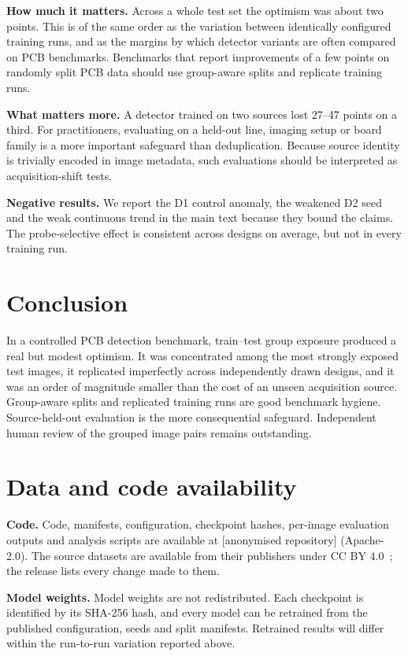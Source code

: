 \documentclass[11pt]{article}
\begin{document}
\textbf{How much it matters.} Across a whole test set the optimism was about two points. This is of the same order as the variation between identically configured training runs, and as the margins by which detector variants are often compared on PCB benchmarks. Benchmarks that report improvements of a few points on randomly split PCB data should use group-aware splits and replicate training runs.

\textbf{What matters more.} A detector trained on two sources lost 27--47 points on a third. For practitioners, evaluating on a held-out line, imaging setup or board family is a more important safeguard than deduplication. Because source identity is trivially encoded in image metadata, such evaluations should be interpreted as acquisition-shift tests.

\textbf{Negative results.} We report the D1 control anomaly, the weakened D2 seed and the weak continuous trend in the main text because they bound the claims. The probe-selective effect is consistent across designs on average, but not in every training run.

\section{Conclusion}
In a controlled PCB detection benchmark, train--test group exposure produced a real but modest optimism. It was concentrated among the most strongly exposed test images, it replicated imperfectly across independently drawn designs, and it was an order of magnitude smaller than the cost of an unseen acquisition source. Group-aware splits and replicated training runs are good benchmark hygiene. Source-held-out evaluation is the more consequential safeguard. Independent human review of the grouped image pairs remains outstanding.

\section{Data and code availability}
\textbf{Code.} Code, manifests, configuration, checkpoint hashes, per-image evaluation outputs and analysis scripts are available at [anonymised repository] (Apache-2.0). The source datasets are available from their publishers under CC BY 4.0~\cite{lv2024dspcbsd,yan2026pcbind,rashid2025pcbdefect}; the release lists every change made to them.

\textbf{Model weights.} Model weights are not redistributed. Each checkpoint is identified by its SHA-256 hash, and every model can be retrained from the published configuration, seeds and split manifests. Retrained results will differ within the run-to-run variation reported above.




\end{document}
